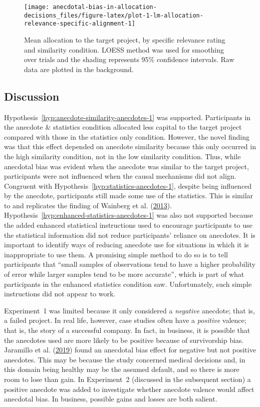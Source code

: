 \documentclass[
  man, donotrepeattitle,floatsintext]{apa7}
\theoremstyle{definition}
\theoremstyle{definition}
\theoremstyle{definition}
\theoremstyle{definition}
\theoremstyle{remark}
\begin{document}
\begin{figure}
\texttt{[image: anecdotal-bias-in-allocation-decisions\_files/figure-latex/plot-1-lm-allocation-relevance-specific-alignment-1]} \caption{Mean allocation to the target project, by specific relevance rating and similarity condition. LOESS method was used for smoothing over trials and the shading represents 95\% confidence intervals. Raw data are plotted in the background.}\label{fig:plot-1-lm-allocation-relevance-specific-alignment}
\end{figure}

\hypertarget{discussion}{%
\subsection{Discussion}\label{discussion}}

Hypothesis~\ref{hyp:anecdote-similarity-anecdotes-1} was supported.
Participants in the anecdote \& statistics condition allocated less capital to
the target project compared with those in the statistics only condition.
However, the novel finding was that this effect depended on anecdote similarity
because this only occurred in the high similarity condition, not in the low
similarity condition. Thus, while anecdotal bias was evident when the anecdote
was similar to the target project, participants were not influenced when the
causal mechanisms did not align. Congruent with
Hypothesis~\ref{hyp:statistics-anecdotes-1}, despite being influenced by the
anecdote, participants still made some use of the statistics. This is similar to
and replicates the finding of Wainberg et al. (\protect\hyperlink{ref-wainberg2013}{2013}).
Hypothesis~\ref{hyp:enhanced-statistics-anecdotes-1} was also not supported
because the added enhanced statistical instructions used to encourage
participants to use the statistical information did not reduce participants'
reliance on anecdotes. It is important to identify ways of reducing anecdote use
for situations in which it is inappropriate to use them. A promising simple
method to do so is to tell participants that ``small samples of observations tend
to have a higher probability of error while larger samples tend to be more
accurate'', which is part of what participants in the enhanced statistics
condition saw. Unfortunately, such simple instructions did not appear to work.

Experiment~1 was limited because it only considered a \emph{negative} anecdote; that
is, a failed project. In real life, however, case studies often have a
\emph{positive} valence; that is, the story of a successful company. In fact, in
business, it is possible that the anecdotes used are more likely to be positive
because of survivorship bias. Jaramillo et al. (\protect\hyperlink{ref-jaramillo2019}{2019}) found an anecdotal bias effect for
negative but not positive anecdotes. This may be because the study concerned
medical decisions and, in this domain being healthy may be the assumed default,
and so there is more room to lose than gain. In Experiment~2 (discussed in the
subsequent section) a positive anecdote was added to investigate whether
anecdote valence would affect anecdotal bias. In business, possible gains and
losses are both salient.
\end{document}
